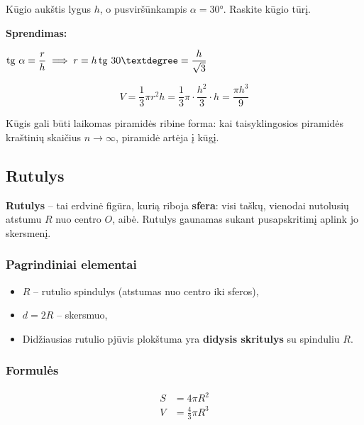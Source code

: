 \begin{exercise}
Kūgio aukštis lygus $h$, o pusviršūnkampis $\alpha = 30°$. Raskite kūgio tūrį.

\textbf{Sprendimas:}

$\tg\,\alpha = \dfrac{r}{h} \implies r = h\tg\,30° = \dfrac{h}{\sqrt{3}}$

\[
V = \frac{1}{3}\pi r^2 h = \frac{1}{3}\pi \cdot \frac{h^2}{3} \cdot h = \frac{\pi h^3}{9}
\]
\end{exercise}

\begin{remark}
Kūgis gali būti laikomas piramidės ribine forma: kai taisyklingosios piramidės kraštinių skaičius $n \to \infty$, piramidė artėja į kūgį.
\end{remark}

\subsection{Rutulys}

\begin{definition}
\textbf{Rutulys} – tai erdvinė figūra, kurią riboja \textbf{sfera}: visi taškų, vienodai nutolusių atstumu $R$ nuo centro $O$, aibė. Rutulys gaunamas sukant pusapskritimį aplink jo skersmenį.
\end{definition}

\subsubsection*{Pagrindiniai elementai}

\begin{itemize}
    \item $R$ – rutulio spindulys (atstumas nuo centro iki sferos),
    \item $d = 2R$ – skersmuo,
    \item Didžiausias rutulio pjūvis plokštuma yra \textbf{didysis skritulys} su spinduliu $R$.
\end{itemize}

\subsubsection*{Formulės}

\begin{tcolorbox}[title=Rutulio formulės, colback=red!5!white, colframe=red!60!black]
\begin{align}
    S &= 4\pi R^2 \\
    V &= \frac{4}{3}\pi R^3
\end{align}
\end{tcolorbox}

